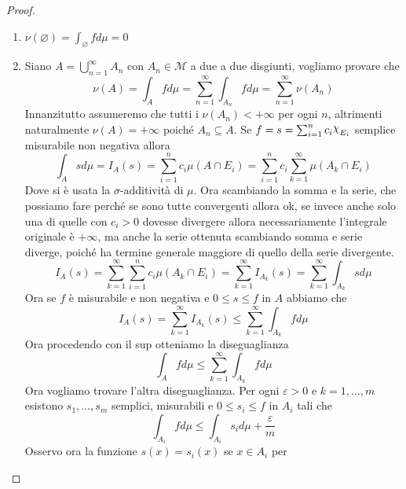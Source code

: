 \begin{proof}
    \begin{enumerate}[label = \arabic*.]
        \item \(\nu(\varnothing) = \int_{\varnothing} f d\mu = 0\)
        \item Siano \(A = \bigcup_{n=1}^{\infty} A_{n} \) con \(A_{n} \in
            \mathcal{M}\) a due a due disgiunti, vogliamo provare che 
            \[
                \nu(A) = \int_{A} f d\mu = \sum_{n=1}^{\infty} \int_{A_{n}} f
                d\mu = \sum_{n=1}^{\infty} \nu(A_{n})
            \]
            Innanzitutto assumeremo che tutti i \(\nu(A_{n}) < +\infty\) per
            ogni \(n\), altrimenti naturalmente \(\nu(A) = +\infty\) poiché
            \(A_{n} \subseteq A \).
            Se \(f = s = \sum_{i=1}^{n} c_{i}\rchi_{E_{i}} \) semplice misurabile non negativa allora
            \[
                \int_A s d\mu = I_A(s) = \sum_{i=1}^{n} c_{i} \mu(A \cap E_{i}) = \sum_{i=1}^{n}
                c_{i} \sum_{k=1}^{\infty} \mu(A_k \cap E_{i})
            \]
            Dove si è usata la \(\sigma\)-additività di \(\mu\). Ora scambiando
            la somma e la serie, che possiamo fare perché se sono tutte
            convergenti allora ok, se invece anche solo una di quelle con
            \(c_{i} >0\) dovesse divergere allora necessariamente l'integrale
            originale è \(+\infty\), ma anche la serie ottenuta scambiando somma
            e serie diverge, poiché ha termine generale maggiore di quello della
            serie divergente.
            \[
                I_A(s) = \sum_{k=1}^{\infty} \sum_{i=1}^{n} c_{i} \mu(A_k \cap
                E_{i}) = \sum_{k=1}^{\infty} I_{A_k}(s) = \sum_{k=1}^{\infty}
                \int_{A_k} s d\mu
            \]
            Ora se \(f\) è misurabile e non negativa e \(0 \le s \le f\) in
            \(A\) abbiamo che
            \[
                I_A(s) = \sum_{k=1}^{\infty} I_{A_k}(s) \le  \sum_{k=1}^{\infty}
                \int_{A_k}  f d\mu
            \]
            Ora procedendo con il sup otteniamo la diseguaglianza 
            \[
                \int_{A} f d\mu \le \sum_{k=1}^{\infty} \int_{A_k} f d\mu
            \]
            Ora vogliamo trovare l'altra diseguaglianza. Per ogni
            \(\varepsilon>0\) e \(k = 1, \dots, m\) esistono \(s_{1}, \dots,
            s_{m}\) semplici, misurabili e \(0 \le s_{i} \le f\) in \(A_{i}\)
            tali che 
            \[
                \int_{A_{i}} f d\mu \le \int_{A_{i}} s_{i} d\mu +
                \frac{\varepsilon}{m}
            \]
            Osservo ora la funzione \(s(x) = s_{i}(x)\) se \(x \in A_{i}\) per

\end{enumerate}
\end{proof}
